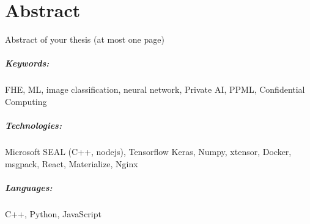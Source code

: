 \chapter*{Abstract}
Abstract of your thesis (at most one page)


\paragraph{Keywords:}
FHE, ML, image classification, neural network,
Private AI, PPML, Confidential Computing

\paragraph{Technologies:}
Microsoft SEAL (C++, nodejs),
Tensorflow Keras,
Numpy,
xtensor,
Docker,
msgpack,
React,
Materialize,
Nginx

\paragraph{Languages:}
C++, Python, JavaScript
